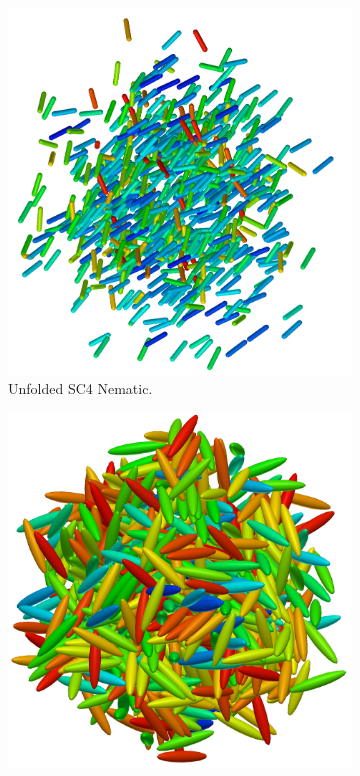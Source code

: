 \begin{figure}
  \begin{center}
    \begin{subfigure}{0.4\textwidth}
      \includegraphics[width=\textwidth]{assets/images/configs/nematic}
      \caption{Unfolded SC4 Nematic.}
      \label{sc4_fig}
    \end{subfigure}
    \begin{subfigure}{0.4\textwidth}
      \includegraphics[width=\textwidth]{assets/images/configs/iso}

\end{subfigure}
\end{center}
\end{figure}
